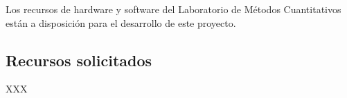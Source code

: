 \documentclass[11pt,spanish]{article}
\begin{document}
Los recursos de hardware y software del Laboratorio de Métodos Cuantitativos
están a disposición para el desarrollo de este proyecto.

\subsection{Recursos solicitados}


XXX








%
%
%
%
%
\end{document}
